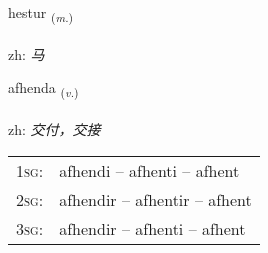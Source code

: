 \documentclass[frontgrid, backgrid]{flacards}\usepackage[]{graphicx}\usepackage[]{color}
\begin{document}
\renewcommand{\flhead}{\vskip5pt \fboxsep=0pt {\small\bfseries\footnotesize Nafnorð | 名词}}
\renewcommand{\fcfoot}{\vskip5pt \fboxsep=0pt \hspace{2pt}{\small\bfseries\footnotesize 2K}}

\renewcommand{\blhead}{\vskip5pt {\small\bfseries\footnotesize Nafnorð | 名词 }}
\renewcommand{\bcfoot}{\vskip5pt \hspace{2pt}{\small\bfseries\footnotesize 2K}}


{hestur \small{\textsubscript{(\textit{m.})}} \\[1ex] %
\textphonetic{[hɛstʏr]} \\
zh: \emph{马} \\  [2ex]
\renewcommand*{\arraystretch}{0.8}
}

\renewcommand{\flhead}{\vskip5pt \fboxsep=0pt {\small\bfseries\footnotesize Sagnorð | 动词}}
\renewcommand{\fcfoot}{\vskip5pt \fboxsep=0pt \hspace{2pt}{\small\bfseries\footnotesize 2K}}

\renewcommand{\blhead}{\vskip5pt {\small\bfseries\footnotesize Sagnorð | 动词 }}
\renewcommand{\bcfoot}{\vskip5pt \hspace{2pt}{\small\bfseries\footnotesize 2K}}


{afhenda \small{\textsubscript{(\textit{v.})}} \\[1ex] %
\textphonetic{[afhɛnta]} \\
zh: \emph{交付，交接} \\  [2ex]
\renewcommand*{\arraystretch}{0.8}
\begin{tabular}{p{1cm}l}
\textsc{1sg}: & afhendi -- afhenti -- afhent \\ 
\textsc{2sg}: & afhendir -- afhentir -- afhent \\ 
\textsc{3sg}: & afhendir -- afhenti -- afhent \\ 
\end{tabular}
}
\end{document}
